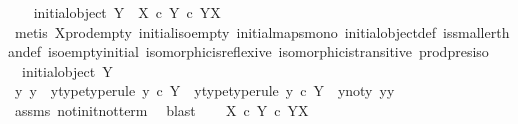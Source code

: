 \begin{isabellebody}
\ \ \isamarkupfalse%
\ {\isachardoublequoteopen}initial{\isacharunderscore}{\kern0pt}object\ Y\ {\isasymLongrightarrow}\ X\ {\isasymtimes}\isactrlsub c\ Y\ {\isasymle}\isactrlsub c\ Y\isactrlbsup X\isactrlesup {\isachardoublequoteclose}\isanewline
\ \ \ \ \isamarkupfalse%
\ {\isacharparenleft}{\kern0pt}metis\ X{\isacharunderscore}{\kern0pt}prod{\isacharunderscore}{\kern0pt}empty\ initial{\isacharunderscore}{\kern0pt}iso{\isacharunderscore}{\kern0pt}empty\ initial{\isacharunderscore}{\kern0pt}maps{\isacharunderscore}{\kern0pt}mono\ initial{\isacharunderscore}{\kern0pt}object{\isacharunderscore}{\kern0pt}def\ is{\isacharunderscore}{\kern0pt}smaller{\isacharunderscore}{\kern0pt}than{\isacharunderscore}{\kern0pt}def\ iso{\isacharunderscore}{\kern0pt}empty{\isacharunderscore}{\kern0pt}initial\ isomorphic{\isacharunderscore}{\kern0pt}is{\isacharunderscore}{\kern0pt}reflexive\ isomorphic{\isacharunderscore}{\kern0pt}is{\isacharunderscore}{\kern0pt}transitive\ prod{\isacharunderscore}{\kern0pt}pres{\isacharunderscore}{\kern0pt}iso{\isacharparenright}{\kern0pt}\isanewline
{}\isamarkupfalse%
\isanewline
\ \ \isamarkupfalse%
\ {\isachardoublequoteopen}{\isasymnot}\ initial{\isacharunderscore}{\kern0pt}object\ Y{\isachardoublequoteclose}\isanewline
\ \ \isamarkupfalse%
\ \isamarkupfalse%
\ y{}\ y{}\ \ y{}{\isacharunderscore}{\kern0pt}type{\isacharbrackleft}{\kern0pt}type{\isacharunderscore}{\kern0pt}rule{\isacharbrackright}{\kern0pt}{\isacharcolon}{\kern0pt}\ {\isachardoublequoteopen}y{}\ {\isasymin}\isactrlsub c\ Y{\isachardoublequoteclose}\ \ y{}{\isacharunderscore}{\kern0pt}type{\isacharbrackleft}{\kern0pt}type{\isacharunderscore}{\kern0pt}rule{\isacharbrackright}{\kern0pt}{\isacharcolon}{\kern0pt}\ {\isachardoublequoteopen}y{}\ {\isasymin}\isactrlsub c\ Y{\isachardoublequoteclose}\ \ y{}{\isacharunderscore}{\kern0pt}not{\isacharunderscore}{\kern0pt}y{}{\isacharcolon}{\kern0pt}\ {\isachardoublequoteopen}y{}{\isasymnoteq}y{}{\isachardoublequoteclose}\isanewline
\ \ \ \ \isamarkupfalse%
\ assms\ not{\isacharunderscore}{\kern0pt}init{\isacharunderscore}{\kern0pt}not{\isacharunderscore}{\kern0pt}term\ \isamarkupfalse%
\ blast\isanewline
\ \ \isamarkupfalse%
\ {\isachardoublequoteopen}{\isacharparenleft}{\kern0pt}X\ {\isasymtimes}\isactrlsub c\ Y{\isacharparenright}{\kern0pt}\ {\isasymle}\isactrlsub c\ {\isacharparenleft}{\kern0pt}Y\isactrlbsup X\isactrlesup {\isacharparenright}{\kern0pt}{\isachardoublequoteclose}\isanewline

\end{isabellebody}
